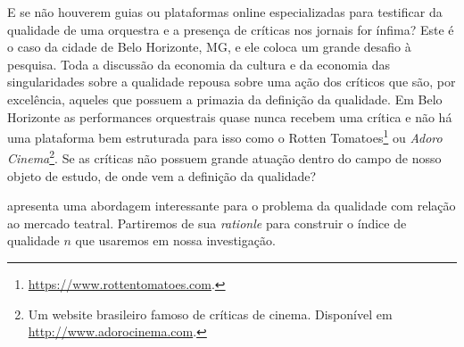 \documentclass[a4paper, 12pt, openright, oneside, german, french, english, brazil]{abntex2}
\begin{document}
	
	E se não houverem guias ou plataformas online especializadas para testificar da qualidade de uma orquestra e a presença de críticas nos jornais for ínfima? Este é o caso da cidade de Belo Horizonte, MG, e ele coloca um grande desafio à pesquisa. Toda a discussão da economia da cultura e da economia das singularidades sobre a qualidade repousa sobre uma ação dos críticos que são, por excelência, aqueles que possuem a primazia da definição da qualidade. Em Belo Horizonte as performances orquestrais quase nunca recebem uma crítica e não há uma plataforma bem estruturada para isso como o Rotten Tomatoes\footnote{\url{https://www.rottentomatoes.com}.} ou \textit{Adoro Cinema}\footnote{Um website brasileiro famoso de críticas de cinema. Disponível em \url{http://www.adorocinema.com}.}. Se as críticas não possuem grande atuação dentro do campo de nosso objeto de estudo, de onde vem a definição da qualidade?
	
	
	 apresenta uma abordagem interessante para o problema da qualidade com relação ao mercado teatral. Partiremos de sua \textit{rationle} para construir o índice de qualidade $n$ que usaremos em nossa investigação.
	
	
\end{document}
